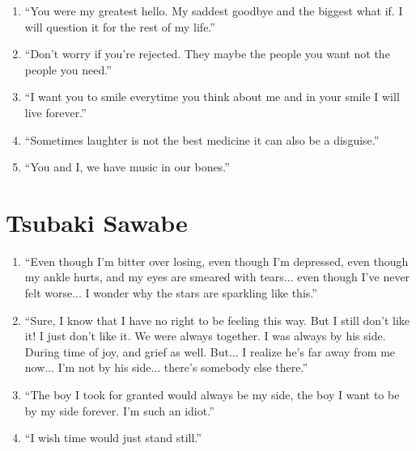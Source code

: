 \documentclass{book}
\numberwithin{equation}{section}
\begin{document}
\begin{enumerate}
    \item ``You were my greatest hello. My saddest goodbye and the biggest what if. I will question it for the rest of my life.''
    \item ``Don't worry if you're rejected. They maybe the people you want not the people you need.''
    \item ``I want you to smile everytime you think about me and in your smile I will live forever.''
    \item ``Sometimes laughter is not the best medicine it can also be a disguise.''
    \item ``You and I, we have music in our bones.''
\end{enumerate}

\section{Tsubaki Sawabe}
\begin{enumerate}
    \item ``Even though I'm bitter over losing, even though I'm depressed, even though my ankle hurts, and my eyes are smeared with tears... even though I've never felt worse... I wonder why the stars are sparkling like this.'' 
    \item ``Sure, I know that I have no right to be feeling this way. But I still don't like it! I just don't like it. We were always together. I was always by his side. During time of joy, and grief as well. But... I realize he's far away from me now... I'm not by his side... there's somebody else there.''
    \item ``The boy I took for granted would always be my side, the boy I want to be by my side forever. I'm such an idiot.''
    \item ``I wish time would just stand still.''
\end{enumerate}
\end{document}
